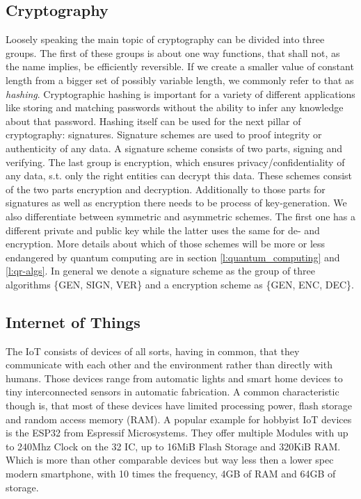 \documentclass[conference]{IEEEtran}
\newcommand{\comment}[1]{}
\begin{document}
\subsection{Cryptography}
Loosely speaking the main topic of cryptography can be divided into three groups.
The first of these groups is about one way functions, that shall not, as the name implies, be efficiently reversible.
If we create a smaller value of constant length from a bigger set of possibly variable length, we commonly refer to that as \textit{hashing}.
Cryptographic hashing is important for a variety of different applications like storing and matching passwords without the ability to infer any knowledge about that password.
Hashing itself can be used for the next pillar of cryptography: signatures.
Signature schemes are used to proof integrity or authenticity of any data.
A signature scheme consists of two parts, signing and verifying. 
The last group is encryption, which ensures privacy/confidentiality of any data, s.t. only the right entities can decrypt this data.
These schemes consist of the two parts encryption and decryption.
Additionally to those parts for signatures as well as encryption there needs to be process of key-generation.
We also differentiate between symmetric and asymmetric schemes. The first one has a different private and public key while the latter uses the same for de- and encryption.
More details about which of those schemes will be more or less endangered by quantum computing are in section \ref{l:quantum_computing} and \ref{l:qr-algs}.
\newline
In general we denote a signature scheme as the group of three algorithms \{GEN, SIGN, VER\} and a encryption scheme as \{GEN, ENC, DEC\}.
\subsection{Internet of Things}
\comment{ %
- growing: over 3 billion rn \cite{QR_IoT}
} %

The IoT consists of devices of all sorts, having in common, that they communicate with each other and the environment rather than directly with humans.
Those devices range from automatic lights and smart home devices to tiny interconnected sensors in automatic fabrication.
A common characteristic though is, that most of these devices have limited processing power, flash storage and random access memory (RAM). 
A popular example for hobbyist IoT devices is the ESP32 from Espressif Microsystems.
They offer multiple Modules with up to 240Mhz Clock on the 32 IC, up to 16MiB Flash Storage and 320KiB RAM.
Which is more than other comparable devices but way less then a lower spec modern smartphone, with 10 times the frequency, 4GB of RAM and 64GB of storage.
\end{document}
